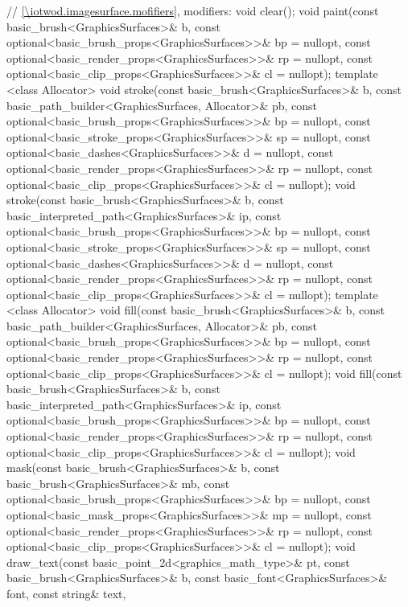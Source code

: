\begin{codeblock}
{{    // \ref{\iotwod.imagesurface.mofifiers}, modifiers:
    void clear();
    void paint(const basic_brush<GraphicsSurfaces>& b,
      const optional<basic_brush_props<GraphicsSurfaces>>& bp = nullopt,
      const optional<basic_render_props<GraphicsSurfaces>>& rp = nullopt,
      const optional<basic_clip_props<GraphicsSurfaces>>& cl = nullopt);
    template <class Allocator>
    void stroke(const basic_brush<GraphicsSurfaces>& b,
      const basic_path_builder<GraphicsSurfaces, Allocator>& pb,
      const optional<basic_brush_props<GraphicsSurfaces>>& bp = nullopt,
      const optional<basic_stroke_props<GraphicsSurfaces>>& sp = nullopt,
      const optional<basic_dashes<GraphicsSurfaces>>& d = nullopt,
      const optional<basic_render_props<GraphicsSurfaces>>& rp = nullopt,
      const optional<basic_clip_props<GraphicsSurfaces>>& cl = nullopt);
    void stroke(const basic_brush<GraphicsSurfaces>& b,
      const basic_interpreted_path<GraphicsSurfaces>& ip,
      const optional<basic_brush_props<GraphicsSurfaces>>& bp = nullopt,
      const optional<basic_stroke_props<GraphicsSurfaces>>& sp = nullopt,
      const optional<basic_dashes<GraphicsSurfaces>>& d = nullopt,
      const optional<basic_render_props<GraphicsSurfaces>>& rp = nullopt,
      const optional<basic_clip_props<GraphicsSurfaces>>& cl = nullopt);
    template <class Allocator>
    void fill(const basic_brush<GraphicsSurfaces>& b,
      const basic_path_builder<GraphicsSurfaces, Allocator>& pb,
      const optional<basic_brush_props<GraphicsSurfaces>>& bp = nullopt,
      const optional<basic_render_props<GraphicsSurfaces>>& rp = nullopt,
      const optional<basic_clip_props<GraphicsSurfaces>>& cl = nullopt);
    void fill(const basic_brush<GraphicsSurfaces>& b,
      const basic_interpreted_path<GraphicsSurfaces>& ip,
      const optional<basic_brush_props<GraphicsSurfaces>>& bp = nullopt,
      const optional<basic_render_props<GraphicsSurfaces>>& rp = nullopt,
      const optional<basic_clip_props<GraphicsSurfaces>>& cl = nullopt);
    void mask(const basic_brush<GraphicsSurfaces>& b,
      const basic_brush<GraphicsSurfaces>& mb,
      const optional<basic_brush_props<GraphicsSurfaces>>& bp = nullopt,
      const optional<basic_mask_props<GraphicsSurfaces>>& mp = nullopt,
      const optional<basic_render_props<GraphicsSurfaces>>& rp = nullopt,
      const optional<basic_clip_props<GraphicsSurfaces>>& cl = nullopt);
    void draw_text(const basic_point_2d<graphics_math_type>& pt,
      const basic_brush<GraphicsSurfaces>& b,
      const basic_font<GraphicsSurfaces>& font, const string& text,
}}
\end{codeblock}
